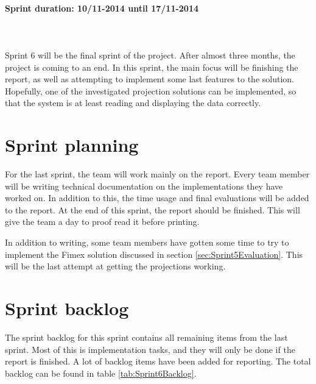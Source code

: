 \documentclass[11pt,a4paper,titlepage,oneside]{report}
\begin{document}
\paragraph{Sprint duration: 10/11-2014 until 17/11-2014} \hfill \\
\\
\noindent
Sprint 6 will be the final sprint of the project. After almost three months, the project is coming to an end. In this sprint, the main focus will be finishing the report, as well as attempting to implement some last features to the solution. Hopefully, one of the investigated projection solutions can be implemented, so that the system is at least reading and displaying the data correctly.
\section{Sprint planning}
For the last sprint, the team will work mainly on the report. Every team member will be writing technical documentation on the implementations they have worked on. In addition to this, the time usage and final evaluations will be added to the report. At the end of this sprint, the report should be finished. This will give the team a day to proof read it before printing. 

In addition to writing, some team members have gotten some time to try to implement the \gls{Fimex} solution discussed in section \ref{sec:Sprint5Evaluation}. This will be the last attempt at getting the projections working. 

\section{Sprint backlog}
\label{sec:Sprint6Backlog}
The sprint backlog for this sprint contains all remaining items from the last sprint. Most of this is implementation tasks, and they will only be done if the report is finished. A lot of backlog items have been added for reporting. The total backlog can be found in table \ref{tab:Sprint6Backlog}.
\end{document}
